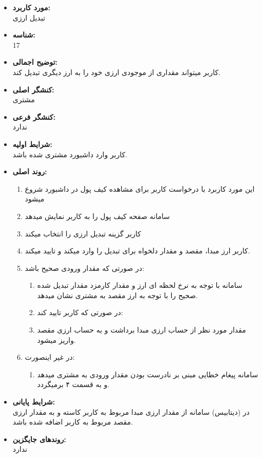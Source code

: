 \documentclass{article}
\begin{document}
\begin{itemize}
\item \textbf{مورد کاربرد:}\\
تبدیل ارزی
\item \textbf{شناسه:}\\
17
\item \textbf{توضیح اجمالی:}\\
کاربر میتواند مقداری از موجودی ارزی خود را به ارز دیگری تبدیل کند.
\item \textbf{کنشگر اصلی:}\\
مشتری
\item \textbf{کنشگر فرعی:}\\
ندارد
\item \textbf{شرایط اولیه:}\\
کاربر وارد داشبورد مشتری شده باشد.
\item \textbf{روند اصلی:}\\
\begin{enumerate}
\item  این مورد کاربرد با درخواست کاربر برای مشاهده کیف پول در داشبورد شروع میشود
\item سامانه صفحه  کیف پول را به کاربر نمایش میدهد
\item کاربر گزینه  تبدیل ارزی را انتخاب میکند
\item  کاربر ارز مبدا، مقصد و مقدار دلخواه برای تبدیل را وارد میکند و تایید میکند.
\item در صورتی که مقدار ورودی صحیح باشد:
\begin{enumerate}
\item سامانه با توجه به نرخ لحظه ای ارز و مقدار کارمزد مقدار تبدیل شده صحیح را با توجه به ارز مقصد به مشتری نشان میدهد.  
\item در صورتی که کاربر تایید کند:
\item مقدار مورد نظر از حساب ارزی مبدا برداشت و به حساب ارزی مقصد واریز میشود.
\end{enumerate}
\item در غیر اینصورت:
\begin{enumerate}
\item  سامانه پیغام خطایی مبنی بر نادرست بودن مقدار ورودی به مشتری میدهد و به قسمت ۴ برمیگردد.
\end{enumerate}
\end{enumerate}
\item \textbf{شرایط پایانی:}\\ 
در (دیتابیس) سامانه از مقدار ارزی مبدا مربوط به کاربر کاسته و به مقدار ارزی مقصد مربوط به کاربر اضافه شده باشد.
\item \textbf{روندهای جایگزین:}\\
ندارد
\end{itemize}
\noindent\makebox[\linewidth]{\rule{\paperwidth}{0.4pt}}
\end{document}
